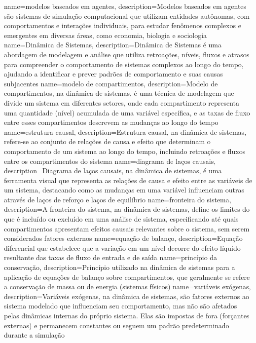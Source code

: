 {
    name=modelos baseados em agentes,
    description={Modelos baseados em agentes são sistemas de simulação computacional que utilizam entidades autônomas, com comportamentos e interações individuais, para estudar fenômenos complexos e emergentes em diversas áreas, como economia, biologia e sociologia}
}
{
    name=Dinâmica de Sistemas,
    description={Dinâmica de Sistemas é uma abordagem de modelagem e análise que utiliza retroações, níveis, fluxos e atrasos para compreender o comportamento de sistemas complexos ao longo do tempo, ajudando a identificar e prever padrões de comportamento e suas causas subjacentes}
}
{
    name=modelo de compartimentos,
    description={Modelo de compartimentos, na dinâmica de sistemas, é uma técnica de modelagem que divide um sistema em diferentes setores, onde cada compartimento representa uma quantidade (nível) acumulada de uma variável específica, e as taxas de fluxo entre esses compartimentos descrevem as mudanças ao longo do tempo}
}
{
    name=estrutura causal,
    description={Estrutura causal, na dinâmica de sistemas, refere-se ao conjunto de relações de causa e efeito que determinam o comportamento de um sistema ao longo do tempo, incluindo retroações e fluxos entre os compartimentos do sistema}
}
{
    name=diagrama de laços causais,
    description={Diagrama de laços causais, na dinâmica de sistemas, é uma ferramenta visual que representa as relações de causa e efeito entre as variáveis de um sistema, destacando como as mudanças em uma variável influenciam outras através de laços de reforço e laços de equilíbrio}
}
{
    name=fronteira do sistema,
    description={A fronteira do sistema, na dinâmica de sistemas, define os limites do que é incluído ou excluído em uma análise de sistema, especificando até quais compartimentos apresentam efeitos causais relevantes sobre o sistema, sem serem considerados fatores externos}
}
{
    name=equação de balanço,
    description={Equação diferencial que estabelece que a variação em um nível decorre do efeito líquido resultante das taxas de fluxo de entrada e de saída}
}
{
    name=princípio da conservação,
    description={Princípio utilizado na dinâmica de sistemas para a aplicação de equações de balanço sobre compartimentos, que geralmente se refere a conservação de massa ou de energia (sistemas físicos)}
}
{
    name=variáveis exógenas,
    description={Variáveis exógenas, na dinâmica de sistemas, são fatores externos ao sistema modelado que influenciam seu comportamento, mas não são afetados pelas dinâmicas internas do próprio sistema. Elas são impostas de fora (forçantes externas) e permanecem constantes ou seguem um padrão predeterminado durante a simulação}
}
